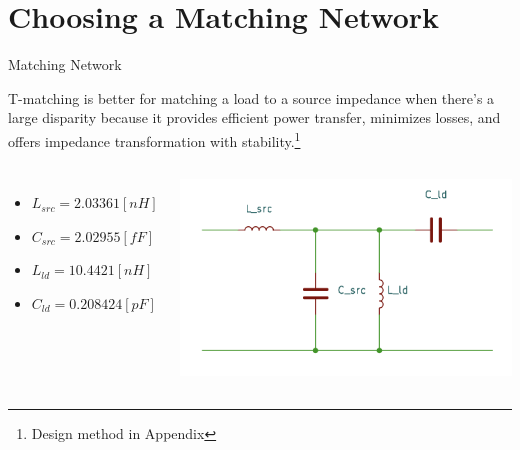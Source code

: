 \documentclass{beamer}
\begin{document}

\section{Choosing a Matching Network}


\begin{frame}{Matching Network}

T-matching is better for matching a load to a source impedance when there's a large disparity because it provides efficient power transfer, minimizes losses, and offers impedance transformation with stability.\footnote{Design method in Appendix}
\begin{columns}

  \begin{itemize}
    \item \(L_{src} = 2.03361[nH]\)
    \item \(C_{src} = 2.02955[fF]\)
    \item \(L_{ld} = 10.4421[nH]\)
    \item \(C_{ld} = 0.208424[pF]\)
  \end{itemize}
  \includegraphics[width = \linewidth]{images/matching_network.png}
\end{columns}
  
\end{frame}
\end{document}
